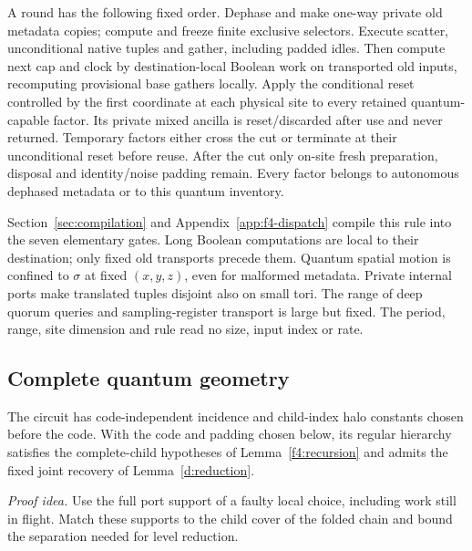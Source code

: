A round has the following fixed order. Dephase and make one-way private
old metadata copies; compute and freeze finite exclusive selectors.
Execute scatter, unconditional native tuples and gather, including
padded idles. Then compute next cap and clock by destination-local
Boolean work on transported old inputs, recomputing provisional base
gathers locally. Apply the conditional reset controlled by the first coordinate at each physical site
to every retained quantum-capable factor. Its private mixed ancilla
is reset/discarded after use and never returned. Temporary factors
either cross the cut or terminate at their unconditional reset before
reuse. After the cut only on-site fresh preparation, disposal and
identity/noise padding remain. Every factor belongs to autonomous
dephased metadata or to this quantum inventory.

Section~\ref{sec:compilation} and Appendix~\ref{app:f4-dispatch}
compile this rule into the seven elementary gates. Long Boolean
computations are local to their destination; only fixed old transports
precede them. Quantum spatial motion is confined to \(\sigma\) at
fixed \((x,y,z)\), even for malformed metadata. Private internal ports
make translated tuples disjoint also on small tori. The range of deep
quorum queries and sampling-register transport is large but fixed. The period,
range, site dimension and rule read no size, input index or rate.

\subsection{Complete quantum geometry}\label{f4:geometry-section}
\begin{lemma}\label{f4:geometry}
The circuit has code-independent incidence and child-index halo
constants chosen before the code. With the code and padding chosen
below, its regular hierarchy satisfies the complete-child hypotheses
of Lemma~\ref{f4:recursion} and admits the fixed joint recovery of
Lemma~\ref{d:reduction}.
\end{lemma}
\par\noindent\emph{Proof idea.} Use the full port support of a faulty local choice, including work still in flight. Match these supports to the child cover of the folded chain and bound the separation needed for level reduction.

